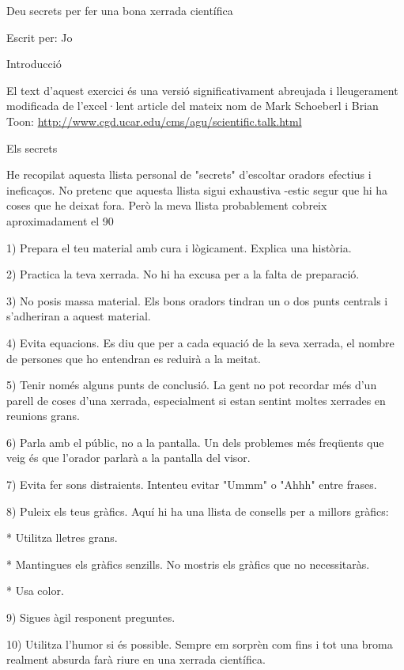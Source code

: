 \documentclass[12pt]{article}
\begin{document}
Deu secrets per fer una bona xerrada científica

Escrit per: Jo

Introducció

El text d'aquest exercici és una versió significativament abreujada i lleugerament modificada de l'excel·lent article del mateix nom de Mark Schoeberl i Brian Toon:
\url{http://www.cgd.ucar.edu/cms/agu/scientific.talk.html}

Els secrets

He recopilat aquesta llista personal de "secrets" d'escoltar oradors efectius i ineficaços. No pretenc que aquesta llista sigui exhaustiva -estic segur que hi ha coses que he deixat fora. Però la meva llista probablement cobreix aproximadament el 90%

1) Prepara el teu material amb cura i lògicament. Explica una història.

2) Practica la teva xerrada. No hi ha excusa per a la falta de preparació.

3) No posis massa material. Els bons oradors tindran un o dos punts centrals i s'adheriran a aquest material.

4) Evita equacions. Es diu que per a cada equació de la seva xerrada, el nombre de persones que ho entendran es reduirà a la meitat.

5) Tenir només alguns punts de conclusió. La gent no pot recordar més d'un parell de coses d'una xerrada, especialment si estan sentint moltes xerrades en reunions grans.

6) Parla amb el públic, no a la pantalla. Un dels problemes més freqüents que veig és que l'orador parlarà a la pantalla del visor.

7) Evita fer sons distraients. Intenteu evitar "Ummm" o "Ahhh" entre frases.

8) Puleix els teus gràfics. Aquí hi ha una llista de consells per a millors gràfics:

* Utilitza lletres grans.

* Mantingues els gràfics senzills. No mostris els gràfics que no necessitaràs.

* Usa color.

9) Sigues àgil responent preguntes.

10) Utilitza l'humor si és possible. Sempre em sorprèn com fins i tot una broma realment absurda farà riure en una xerrada científica.
\end{document}
